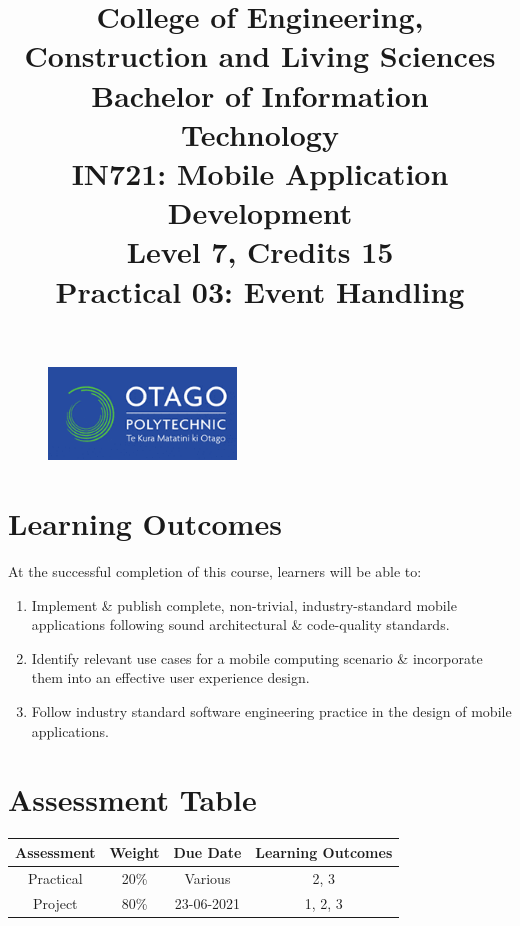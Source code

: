 \documentclass{article}
\author{}
\begin{document}
\begin{figure}
    \centering
    \includegraphics[width=50mm]{../img/logo.png}
\end{figure}

\title{College of Engineering, Construction and Living Sciences\\Bachelor of Information Technology\\IN721: Mobile Application Development\\Level 7, Credits 15\\\textbf{Practical 03: Event Handling}}
\date{}
\maketitle

\section*{Learning Outcomes}
At the successful completion of this course, learners will be able to: 
\begin{enumerate}
	\item Implement \& publish complete, non-trivial, industry-standard mobile applications following sound architectural \& code-quality standards.
	\item Identify relevant use cases for a mobile computing scenario \& incorporate them into an effective user experience design.
	\item Follow industry standard software engineering practice in the design of mobile applications.
\end{enumerate} 


\section*{Assessment Table}
\renewcommand{\arraystretch}{1.5}	
\begin{tabular}{|c|c|c|c|}
	\hline
	\textbf{Assessment} & \textbf{Weight} & \textbf{Due Date} & \textbf{Learning Outcomes} \\ \hline
	Practical           & 20\%            & Various           & 2, 3                       \\ \hline
	Project             & 80\%            & 23-06-2021        & 1, 2, 3                    \\ \hline
\end{tabular} 

 
\end{document}
